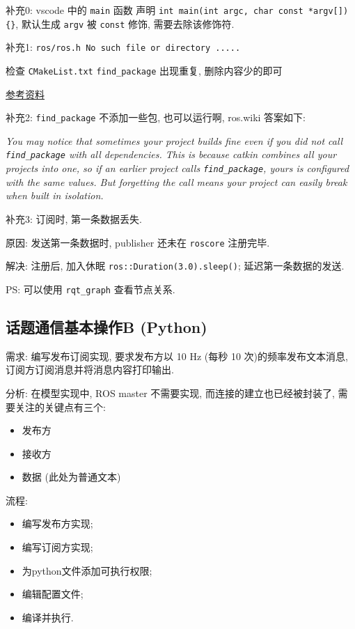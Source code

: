 \documentclass[openany, fontset=windowsold]{ctexbook}
\theoremstyle{kaiti}
\theoremstyle{normal}
\begin{document}
补充0: vscode 中的 \verb|main| 函数 声明 \verb|int main(int argc, char const *argv[]){}|, 默认生成 \verb|argv| 被 \verb|const| 修饰, 需要去除该修饰符.

补充1: \verb|ros/ros.h No such file or directory .....|

检查 \verb|CMakeList.txt| \verb|find_package| 出现重复, 删除内容少的即可

\href{https://answers.ros.org/question/237494/fatal-error-rosrosh-no-such-file-or-directory/}{参考资料}

补充2: \verb|find_package| 不添加一些包, 也可以运行啊,  ros.wiki 答案如下:

{\itshape You may notice that sometimes your project builds fine even if you did not call \verb|find_package| with all dependencies. This is because catkin combines all your projects into one, so if an earlier project calls \verb|find_package|, yours is configured with the same values. But forgetting the call means your project can easily break when built in isolation.}

补充3: 订阅时, 第一条数据丢失.

原因: 发送第一条数据时, publisher 还未在 \verb|roscore| 注册完毕.

解决: 注册后, 加入休眠 \verb|ros::Duration(3.0).sleep()|; 延迟第一条数据的发送.

PS: 可以使用 \verb|rqt_graph| 查看节点关系.

\subsection{话题通信基本操作B (Python)}

需求: 编写发布订阅实现, 要求发布方以 10 Hz (每秒 10 次)的频率发布文本消息, 订阅方订阅消息并将消息内容打印输出.

分析: 在模型实现中, ROS master 不需要实现, 而连接的建立也已经被封装了, 需要关注的关键点有三个:

\begin{itemize}
  \item 发布方
  \item 接收方
  \item 数据 (此处为普通文本)
\end{itemize}

流程:

\begin{itemize}
  \item 编写发布方实现; 
  \item 编写订阅方实现; 
  \item 为python文件添加可执行权限; 
  \item 编辑配置文件; 
  \item 编译并执行.
\end{itemize}
\end{document}
